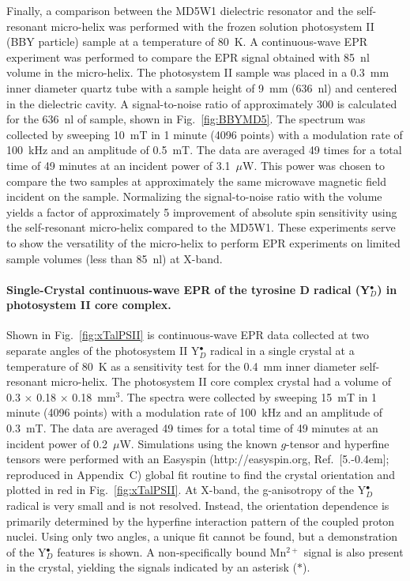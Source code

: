 Finally, a comparison between the MD5W1 dielectric resonator and the self-resonant micro-helix was performed with the frozen solution photosystem II (BBY particle) sample at a temperature of 80~K. A continuous-wave EPR experiment was performed to compare the EPR signal obtained with 85~nl volume in the micro-helix. The photosystem II sample was placed in a 0.3~mm inner diameter quartz tube with a sample height of 9~mm (636~nl) and centered in the dielectric cavity. A signal-to-noise ratio of approximately 300 is calculated for the 636~nl of sample, shown in Fig.~\ref{fig:BBYMD5}. The spectrum was collected by sweeping 10~mT in 1 minute (4096 points) with a modulation rate of 100~kHz and an amplitude of 0.5~mT. The data are averaged 49 times for a total time of 49 minutes at an incident power of 3.1~$\mu$W. This power was chosen to compare the two samples at approximately the same microwave magnetic field incident on the sample. Normalizing the signal-to-noise ratio with the volume yields a factor of approximately 5 improvement of absolute spin sensitivity using the self-resonant micro-helix compared to the MD5W1. These experiments serve to show the versatility of the micro-helix to perform EPR experiments on limited sample volumes (less than 85~nl) at X-band.

\paragraph{Single-Crystal continuous-wave EPR of the tyrosine D radical (Y$_D^\bullet$) in photosystem II core complex.}
Shown in Fig.~\ref{fig:xTalPSII} is continuous-wave EPR data collected at two separate angles of the photosystem II Y$_D^\bullet$ radical in a single crystal at a temperature of 80~K as a sensitivity test for the 0.4~mm inner diameter self-resonant micro-helix. The photosystem II core complex crystal had a volume of 0.3 $\times$ 0.18 $\times$ 0.18~mm$^3$. The spectra were collected by sweeping 15~mT in 1 minute (4096 points) with a modulation rate of 100~kHz and an amplitude of 0.3~mT. The data are averaged 49 times for a total time of 49 minutes at an incident power of 0.2~$\mu$W. Simulations using the known $g$-tensor and hyperfine tensors \cite{Hofbauer6623} were performed with an Easyspin (http://easyspin.org, Ref.~[5.\kern-0.4em]; reproduced in Appendix~C) global fit routine to find the crystal orientation and plotted in red in Fig.~\ref{fig:xTalPSII}. At X-band, the g-anisotropy of the Y$_D^\bullet$ radical is very small and is not resolved. Instead, the orientation dependence is primarily determined by the hyperfine interaction pattern of the coupled proton nuclei. \cite{Hofbauer6623} Using only two angles, a unique fit cannot be found, but a demonstration of the Y$_D^\bullet$ features is shown. A non-specifically bound Mn$^{2+}$ signal is also present in the crystal, yielding the signals indicated by an asterisk (\mbox{\large $\ast$}). 

